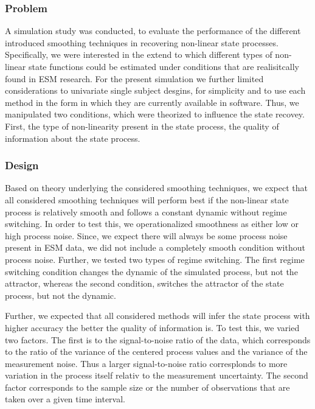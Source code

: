 \subsubsection{Problem}

A simulation study was conducted, to evaluate the performance of the different 
introduced smoothing techniques in recovering non-linear state processes. 
Specifically, we were interested in the extend to which different types 
of non-linear state functions could be estimated under conditions that are 
realisitcally found in ESM research. For the present simulation we further 
limited considerations to univariate single subject desgins, for simplicity and 
to use each method in the form in which they are currently available in software.
Thus, we manipulated two 
conditions, which were theorized to influence the state recovey. First, the type 
of non-linearity present in the state process, the quality of information 
about the state process.

\subsubsection{Design}

Based on theory underlying the considered smoothing techniques, we expect that 
all considered smoothing techniques will perform best if the non-linear state process 
is relatively smooth and follows a constant dynamic without regime switching. 
In order to test this, we operationalized smoothness as either low or high 
process noise. Since, we expect there will always be some process noise present 
in ESM data, we did not include a completely smooth condition without process noise. 
Further, we tested two types of regime switching. The first regime switching 
condition changes the dynamic of the simulated process, but not the attractor, 
whereas the second condition, switches the attractor of the state process, but not the 
dynamic. 

Further, we expected that all considered methods will infer the state process 
with higher accuracy the better the quality of information is. To test this, 
we varied two factors. The first is to the signal-to-noise ratio of the 
data, which corresponds to the ratio of the variance of the centered process values 
and the variance of the measurement noise. Thus a larger signal-to-noise ratio 
corresplonds to more variation in the process itself relativ to the measurement 
uncertainty. The second factor corresponds to the sample size or the 
number of observations that are taken over a given time interval. 

